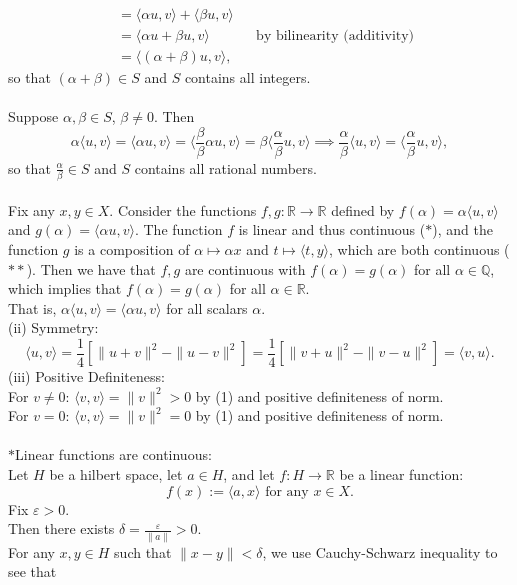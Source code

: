 \begin{enumerate}
\begin{align*}
        &=\langle \alpha u,v\rangle+\langle \beta u,v\rangle\\
        &=\langle \alpha u+\beta u,v\rangle&&\text{by bilinearity (additivity)}\\
        &=\langle (\alpha+\beta)u,v\rangle,
    \end{align*}
    so that $(\alpha+\beta)\in S$ and $S$ contains all integers.\\
    \\Suppose $\alpha,\beta\in S$, $\beta\neq0$.
    Then 
    \[
        \alpha\langle u,v\rangle=\langle \alpha u,v\rangle=\langle \frac{\beta}{\beta}\alpha u,v\rangle=\beta\langle \frac{\alpha}{\beta}u,v\rangle\implies \frac{\alpha}{\beta}\langle u,v\rangle=\langle\frac{\alpha}{\beta}u,v\rangle,
    \]
    so that $\frac{\alpha}{\beta}\in S$ and $S$ contains all rational numbers.\\
    \\Fix any $x,y\in X$.
    Consider the functions $f,g:\mathbb{R}\to\mathbb{R}$ defined by $f(\alpha)=\alpha\langle u,v\rangle$ and $g(\alpha)=\langle \alpha u,v\rangle$.
    The function $f$ is linear and thus continuous ($\ast$), and the function $g$ is a composition of $\alpha\mapsto\alpha x$ and $t\mapsto\langle t,y\rangle$, which are both continuous ($\ast\ast$).
    Then we have that $f,g$ are continuous with $f(\alpha)=g(\alpha)$ for all $\alpha\in\mathbb{Q}$, which implies that $f(\alpha)=g(\alpha)$ for all $\alpha\in\mathbb{R}$.
    \\That is, $\alpha\langle u,v\rangle=\langle \alpha u,v\rangle$ for all scalars $\alpha$.
    \\(ii) Symmetry:
    \[\langle u,v \rangle = \frac{1}{4}[\|u+v\|^2-\|u-v\|^2]=\frac{1}{4}[\|v+u\|^2-\|v-u\|^2]=\langle v,u\rangle.\]
    (iii) Positive Definiteness:
    \\For $v\neq0$: $\langle v,v \rangle = \|v\|^2>0$ by (1) and positive definiteness of norm.
    \\For $v=0$: $\langle v,v \rangle = \|v\|^2=0$ by (1) and positive definiteness of norm.\\
    \\$\ast$Linear functions are continuous:
    \\Let $H$ be a hilbert space, let $a\in H$, and let $f:H\to\mathbb{R}$ be a linear function:
    \[
        f(x):=\langle a,x\rangle\text{ for any }x\in X.
    \]
    Fix $\varepsilon>0$.
    \\Then there exists $\delta=\frac{\varepsilon}{\|a\|}>0$.
    \\For any $x,y\in H$ such that $\|x-y\|<\delta$, we use Cauchy-Schwarz inequality to see that

\end{enumerate}
